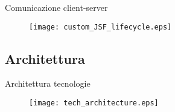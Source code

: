 \begin{frame}{Comunicazione client-server}
\begin{figure}
	\centering
	\texttt{[image: custom\_JSF\_lifecycle.eps]}
\end{figure}

\end{frame}


\subsection{Architettura}

\begin{frame}{Architettura tecnologie}
\begin{figure}
	\centering
	\texttt{[image: tech\_architecture.eps]}
\end{figure}
\end{frame}




